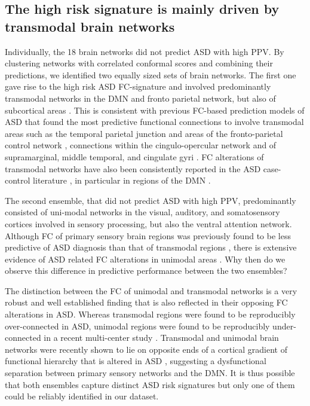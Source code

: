 \documentclass[9pt,lineno]{elife}
\begin{document}
\subsection{The high risk signature is mainly driven by transmodal brain networks}
Individually, the 18 brain networks did not predict ASD with high PPV. By clustering networks with correlated conformal scores and combining their predictions, we identified two equally sized sets of brain networks. The first one gave rise to the high risk ASD FC-signature and involved predominantly transmodal networks in the DMN and fronto parietal network, but also of subcortical areas \citep{Alves2019-ks}. This is consistent with previous FC-based prediction models of ASD that found the most predictive functional connections to involve transmodal areas such as the temporal parietal junction and areas of the fronto-parietal control network \citep{Abraham2017-vf}, connections within the cingulo-opercular network \citep{Yahata2016-jk} and of supramarginal, middle temporal, and cingulate gyri \citep{Heinsfeld2018-yl}. FC alterations of transmodal networks have also been consistently reported in the ASD case-control literature \citep{Monk2009-go,Holiga2019-ub,Just2007-ho}, in particular in regions of the DMN \citep{Washington2014-nx,Assaf2010-jx}.

The second ensemble, that did not predict ASD with high PPV, predominantly consisted of uni-modal networks in the visual, auditory, and somatosensory cortices involved in sensory processing, but also the ventral attention network. Although FC of primary sensory brain regions was previously found to be less predictive of ASD diagnosis than that of transmodal regions \citep{Heinsfeld2018-yl}, there is extensive evidence of ASD related FC alterations in unimodal areas \citep{Oldehinkel2019-ra}. Why then do we observe this difference in predictive performance between the two ensembles?

The distinction between the FC of unimodal and transmodal networks is a very robust and well established finding \citep{Raichle2001-et,Fox2005-ay,Buckner2019-vs} that is also reflected in their opposing FC alterations in ASD. Whereas transmodal regions were found to be reproducibly over-connected in ASD, unimodal regions were found to be reproducibly under-connected in a recent multi-center study \citep{Holiga2019-ub}. Transmodal and unimodal brain networks were recently shown to lie on opposite ends of a cortical gradient of functional hierarchy \citep{Margulies2016-rd} that is altered in ASD \citep{Hong2019-hp}, suggesting a dysfunctional separation between primary sensory networks and the DMN. It is thus possible that both ensembles capture distinct ASD risk signatures but only one of them could be reliably identified in our dataset. 
\end{document}
